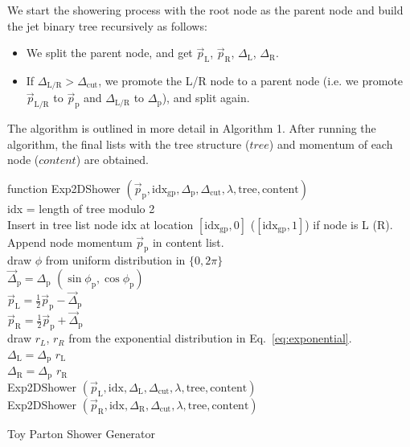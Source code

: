 \documentclass[12pt]{article}
\begin{document}
We start the showering process with the root node as the parent node and build the jet binary tree recursively as follows:
\begin{itemize}

\item We split the parent node, and get $\vec{p}_\text{L}$, $\vec{p}_\text{R}$, $\Delta_\text{L}$, $\Delta_\text{R}$.

\item If $\Delta_\text{L/R} > \Delta_\text{cut}$, we promote the L/R node to a parent node (i.e. we promote $\vec{p}_\text{L/R}$ to $\vec{p}_\text{p}$ and $\Delta_\text{L/R}$ to $\Delta_\text{p}$), and split again.

\end{itemize}

The algorithm is outlined in more detail in Algorithm 1. After running the algorithm, the final lists with the tree structure ($tree$) and momentum of each node ($content$) are obtained.

\begin{algorithm}

    function Exp2DShower $(\vec{p}_{\text{p}},\text{idx}_{\text{gp}}, \Delta_\text{p}, \Delta_\text{cut}, \lambda, \text{tree}, \text{content})$\\
    \Indp
    idx = length of tree modulo 2\\
    Insert in tree list node idx at location $[\text{idx}_\text{gp},0]$ ($[\text{idx}_\text{gp},1]$) if node is L (R). \\
    Append node momentum $\vec{p}_{\text{p}}$ in content list.\\
      {
      	draw $\phi$ from uniform distribution in $\{0,2\pi\}$\\
	$\vec{\Delta}_\text{p}= \Delta_\text{p}\,\,(\sin\phi_\text{p},\cos\phi_\text{p})$\\
      	$\vec{p}_\text{L}= \frac{1}{2} \vec{p}_\text{p} - \vec{\Delta}_\text{p}$  \\
        $\vec{p}_\text{R}= \frac{1}{2} \vec{p}_\text{p} +\vec{\Delta}_\text{p}$\\
        draw $r_L$, $r_R$ from the exponential distribution in Eq.~\ref{eq:exponential}.\\
        $\Delta_\text{L} = \Delta_\text{p} \,\, r_\text{L}$\\
	$\Delta_\text{R} = \Delta_\text{p} \,\, r_\text{R}$\\
	Exp2DShower $(\vec{p}_{\text{L}},\text{idx}, \Delta_\text{L}, \Delta_\text{cut}, \lambda, \text{tree}, \text{content})$\\
	Exp2DShower $(\vec{p}_{\text{R}},\text{idx}, \Delta_\text{R}, \Delta_\text{cut}, \lambda, \text{tree}, \text{content})$\\
      }
    \caption{Toy Parton Shower Generator}
\end{algorithm}
\end{document}
